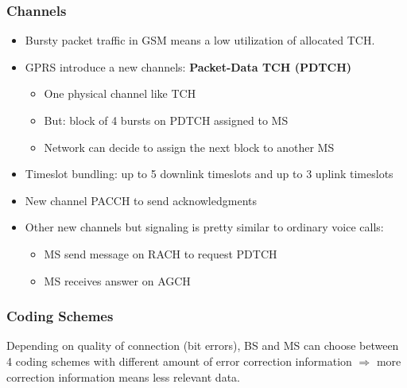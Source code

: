 \subsubsection{Channels}

\begin{itemize}
    \item Bursty packet traffic in GSM means a low utilization of allocated TCH.
    \item GPRS introduce a new channels: \textbf{Packet-Data TCH (PDTCH)}
        \begin{itemize}
            \item One physical channel like TCH
            \item But: block of 4 bursts on PDTCH assigned to MS
            \item Network can decide to assign the next block to 
                another MS
        \end{itemize}
    \item Timeslot bundling: up to 5 downlink timeslots and up
        to 3 uplink timeslots
    \item New channel PACCH to send acknowledgments

    \item Other new channels but signaling is pretty similar to ordinary voice
        calls:
        \begin{itemize}
            \item MS send message on RACH to request PDTCH
            \item MS receives answer on AGCH
        \end{itemize}
\end{itemize}

\subsubsection{Coding Schemes}
Depending on quality of connection (bit errors), BS and 
MS can choose between 4 coding schemes with different amount 
of error correction information $\Rightarrow$ more correction 
information means less relevant data.

